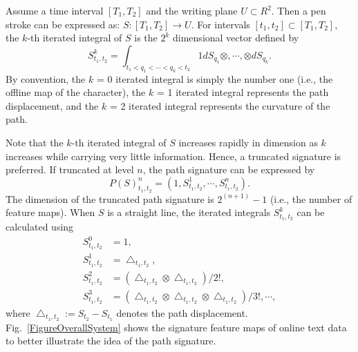 \documentclass[10pt,conference,a4paper]{IEEEtran}
\begin{document}
Assume a time interval $[T_1,T_2]$ and the writing plane $U \subset R^2$. Then a pen stroke can be expressed as: $S:[T_1,T_2]\rightarrow U$. For intervals $[t_1,t_2]\subset [T_1,T_2]$, the $k$-th iterated integral of $S$ is the $2^k$ dimensional vector defined by
\begin{equation}
    S_{t_1,t_2}^k = \int_{t_1<q_1<\cdots <q_k<t_2} 1dS_{q_1} \otimes,\cdots,\otimes dS_{q_k}.
\end{equation}
By convention, the $k$ = 0 iterated integral is simply the number one (i.e., the offline map of the character), the $k$ = 1 iterated integral represents the path displacement, and the $k$ = 2 iterated integral represents the curvature of the path.


Note that the $k$-th iterated integral of $S$ increases rapidly in dimension as $k$ increases while carrying very little information.
Hence, a truncated signature is preferred. If truncated at level $n$, the path signature can be expressed by
\begin{equation}
    P(S)_{t_1,t_2}^n = (1,S_{t_1,t_2}^1,\cdots ,S_{t_1,t_2}^n).
\end{equation}
The dimension of the truncated path signature is $2^{(n+1)}-1$ (i.e., the number of feature maps). When $S$ is a straight line, the iterated integrals $S_{t_1,t_2}^k$ can be calculated using
\begin{equation}
    \begin{split}
        S_{t_1,t_2}^0 &= 1, \\
        S_{t_1,t_2}^1 &=\bigtriangleup_{t_1,t_2}, \\
        S_{t_1,t_2}^2 &=(\bigtriangleup_{t_1,t_2} \otimes \bigtriangleup_{t_1,t_2})/2!,\\
        S_{t_1,t_2}^3 &=(\bigtriangleup_{t_1,t_2} \otimes \bigtriangleup_{t_1,t_2} \otimes \bigtriangleup_{t_1,t_2} )/3!,\cdots,
    \end{split}
\end{equation}
where $\bigtriangleup_{t_1,t_2}:=S_{t_2}-S_{t_1}$ denotes the path displacement.
Fig.~\ref{FigureOverallSystem} shows the signature feature maps of online text data to better illustrate the idea of the path signature.
\end{document}
